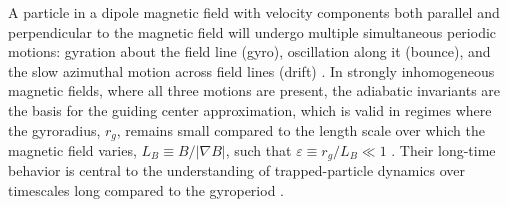 \documentclass{article}
\begin{document}


A particle in a dipole magnetic field with velocity components both parallel and perpendicular to the magnetic field will undergo multiple simultaneous periodic motions: gyration about the field line (gyro), oscillation along it (bounce), and the slow azimuthal motion across field lines (drift) \cite{Northrop1963, Dragt1965, Walt1994}. In strongly inhomogeneous magnetic fields, where all three motions are present, the adiabatic invariants are the basis for the guiding center approximation, which is valid in regimes where the gyroradius, $r_g$, remains small compared to the length scale over which the magnetic field varies, $L_B \equiv {B}/{|\nabla B|}$, such that $\varepsilon \equiv r_g/L_B \ll 1$ \cite{Northrop1963}. Their long-time behavior is central to the understanding of trapped-particle dynamics over timescales long compared to the gyroperiod \cite{DragtFinn1976}.
\end{document}
